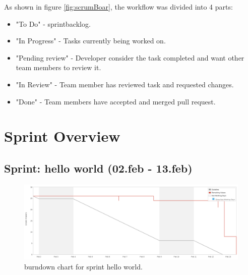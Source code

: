 As shown in figure \ref{fig:scrumBoar}, the workflow was divided into 4 parts:

\begin{itemize}
    \item "To Do" - \Gls{sprintbacklog}.
    \item "In Progress" - Tasks currently being worked on.
    \item "Pending review" - Developer consider the task completed and want other team members to review it.
    \item "In Review" - Team member has reviewed task and requested changes.
    \item "Done" - Team members have accepted and merged pull request.
\end{itemize}

\section{Sprint Overview}
\subsection{Sprint: hello world (02.feb - 13.feb)}
\begin{figure}[H] 
    \includegraphics[width=\textwidth]{inc/images/sprints/sprintHelloWorld020219-130219.png}
    \caption{\Gls{burndown} chart for \gls{sprint} hello world.}
    \label{fig:sprintHellWorld}
\end{figure}




